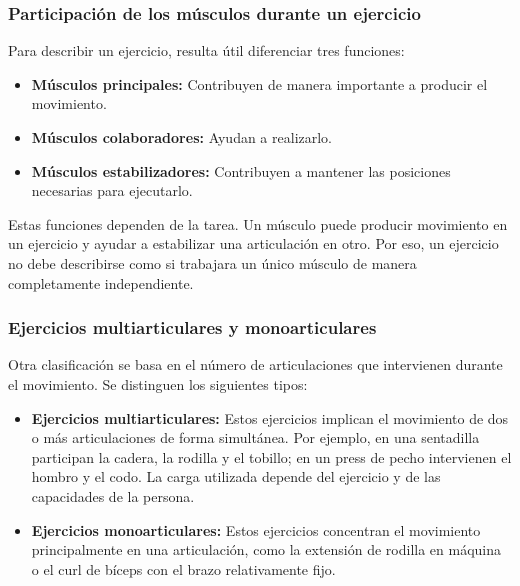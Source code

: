 \clearpage
\subsubsection{Participación de los músculos durante un ejercicio}

Para describir un ejercicio, resulta útil diferenciar tres funciones:

\begin{itemize}
    \item \textbf{Músculos principales:}
    Contribuyen de manera importante a producir el movimiento.

    \item \textbf{Músculos colaboradores:}
    Ayudan a realizarlo.

    \item \textbf{Músculos estabilizadores:}
    Contribuyen a mantener las posiciones necesarias para ejecutarlo.
\end{itemize}

Estas funciones dependen de la tarea. Un músculo puede producir movimiento en
un ejercicio y ayudar a estabilizar una articulación en otro. Por eso, un ejercicio no debe describirse como si trabajara un único
músculo de manera completamente independiente.

\subsubsection{Ejercicios multiarticulares y monoarticulares}

Otra clasificación se basa en el número de articulaciones que intervienen
durante el movimiento. Se distinguen los siguientes tipos:

\begin{itemize}
    \item \textbf{Ejercicios multiarticulares:}
    Estos ejercicios implican el movimiento de dos o más articulaciones de forma simultánea. Por ejemplo, en
    una sentadilla participan la cadera, la rodilla y el tobillo; en un press
    de pecho intervienen el hombro y el codo. La carga utilizada depende del ejercicio y de las capacidades de la persona.

    \item \textbf{Ejercicios monoarticulares:}
    Estos ejercicios concentran el movimiento principalmente en una articulación, como la
    extensión de rodilla en máquina o el curl de bíceps con el brazo
    relativamente fijo.
\end{itemize}

